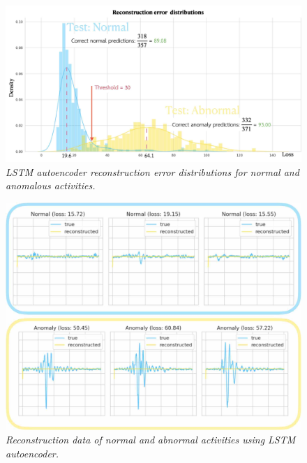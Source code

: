 \begin{figure}[H]
  \centering
  \caption[LSTM autoencoder reconstruction error distributions for normal and anomalous activities.]{\emph{LSTM autoencoder reconstruction error distributions for normal and anomalous activities.}} \label{fig:autoencoder_outcome}
  \includegraphics[scale = 0.18]{figures/autoencoder_outcome.jpg}
\end{figure}

\begin{figure}[H]
  \centering
  \caption[Reconstruction data of normal and abnormal activities using LSTM autoencoder.]{\emph{Reconstruction data of normal and abnormal activities using LSTM autoencoder.}} \label{fig:autoencoder_reconstructed_data}
  \includegraphics[scale = 0.2]{figures/autoencoder_reconstructed_data.jpg}
\end{figure}

